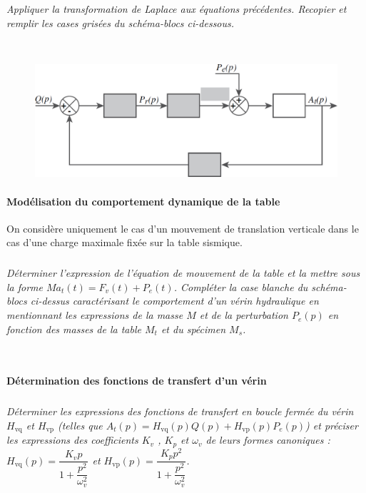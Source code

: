 \documentclass[10pt,fleqn]{article} %
\begin{document}
\subparagraph{\label{q_20}}\textit{Appliquer la transformation de Laplace aux équations précédentes. Recopier et remplir les cases grisées du schéma-blocs ci-dessous.}
\ifprof
\begin{corrige} ~\\

\end{corrige}
\else
\begin{figure}[H]
\centering
\includegraphics[width=0.6\linewidth]{q_20}
\end{figure}
\fi



\paragraph{Modélisation du comportement dynamique de la table}

On considère uniquement le cas d’un mouvement de translation verticale dans le cas d’une charge maximale
fixée sur la table sismique.

\subparagraph{\label{q_}}\textit{Déterminer l’expression de l’équation de mouvement de la table et la mettre sous la forme $Ma_t(t) = F_v (t) + P_e(t)$. Compléter la case blanche du schéma-blocs ci-dessus 
caractérisant le comportement d’un vérin hydraulique en mentionnant les expressions de la
masse $M$ et de la perturbation $P_e(p)$ en fonction des masses de la table $M_t$ et du spécimen
$M_s$.}
\ifprof
\begin{corrige} ~\\

\end{corrige}
\else
\fi

\paragraph{Détermination des fonctions de transfert d’un vérin}

\subparagraph{\label{q_}}\textit{Déterminer les expressions des fonctions de transfert en boucle fermée du vérin $H_{\text{vq}}$ et $H_{\text{vp}}$ (telles que $A_t(p)=H_{\text{vq}}(p) Q(p)+H_{\text{vp}}(p) P_e(p)$) et préciser les expressions des coefficients $K_v$ , $K_p$ et $\omega_v$ de leurs formes canoniques : $H_{\text{vq}}(p)=\dfrac{K_v p}{1+\dfrac{p^2}{\omega_v^2}}$ et $H_{\text{vp}}(p)=\dfrac{K_p p^2}{1+\dfrac{p^2}{\omega_v^2}}$.}
\ifprof
\begin{corrige} ~\\

\end{corrige}
\else
\fi
\end{document}
